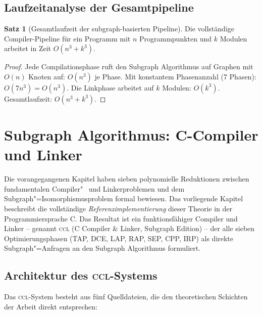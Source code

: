 ﻿\documentclass[a4paper,12pt]{article}
\theoremstyle{definition}
\newtheorem{satz}{Satz}
\begin{document}
\subsection{Laufzeitanalyse der Gesamtpipeline}

\begin{satz}[Gesamtlaufzeit der subgraph-basierten Pipeline]
Die vollständige Compiler-Pipeline für ein Programm mit $n$ Programmpunkten und $k$ Modulen arbeitet in Zeit $O(n^3 + k^3)$.
\end{satz}

\begin{proof}
Jede Compilationsphase ruft den Subgraph Algorithmus auf Graphen mit $O(n)$ Knoten auf: $O(n^3)$ je Phase. Mit konstantem Phasenanzahl (7 Phasen): $O(7 n^3) = O(n^3)$. Die Linkphase arbeitet auf $k$ Modulen: $O(k^3)$. Gesamtlaufzeit: $O(n^3 + k^3)$.
\end{proof}

\section{Subgraph Algorithmus: C-Compiler und Linker}
\label{sec:implementierung}

Die vorangegangenen Kapitel haben sieben polynomielle Reduktionen zwischen
fundamentalen Compiler"~ und Linkerproblemen und dem Subgraph"=Iso\-morphismus\-problem
formal bewiesen. Das vorliegende Kapitel beschreibt die vollständige
\emph{Referenzimplementierung} dieser Theorie in der Programmiersprache C.
Das Resultat ist ein funktionsfähiger Compiler und Linker -- genannt
\textsc{ccl} (C Compiler \& Linker, Subgraph Edition) -- der alle sieben
Optimierungsphasen (TAP, DCE, LAP, RAP, SEP, CPP, IRP) als direkte
Subgraph"=Anfragen an den Subgraph Algorithmus formuliert.

\subsection{Architektur des \textsc{ccl}-Systems}

Das \textsc{ccl}-System besteht aus fünf Quelldateien, die den theoretischen
Schichten der Arbeit direkt entsprechen:
\end{document}

